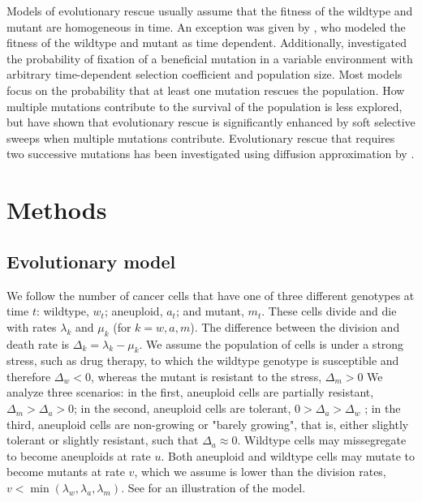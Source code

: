\documentclass[12pt]{extarticle}
\begin{document}
Models of evolutionary rescue usually assume that the fitness of the wildtype and mutant are homogeneous in time. An exception was given by \citet{marrec2020adapt}, who modeled the fitness of the wildtype and mutant as time dependent. Additionally, \citet{uecker2011fixation} investigated the probability of fixation of a beneficial mutation in a variable environment with arbitrary time-dependent selection coefficient and population size.
Most models focus on the probability that at least one mutation rescues the population. How multiple mutations contribute to the survival of the population is less explored, but \citet{wilson2017soft} have shown that evolutionary rescue is significantly enhanced by soft selective sweeps when multiple mutations contribute. 
Evolutionary rescue that requires two successive mutations has been investigated using diffusion approximation by \citet{martin2013probability}.

\section*{Methods}
\subsection*{Evolutionary model}

We follow the number of cancer cells that have one of three different genotypes at time $t$: wildtype, $w_t$; aneuploid, $a_t$; and mutant, $m_t$. 
These cells divide and die with rates $\lambda_k$ and $\mu_k$ (for $k=w, a, m$).
The difference between the division and death rate is $\Delta_k = \lambda_k-\mu_k$.
We assume the population of cells is under a strong stress, such as drug therapy, to which the wildtype genotype is susceptible and therefore $\Delta_w<0$, whereas the mutant is resistant to the stress, $\Delta_m>0$
We analyze three scenarios: in the first, aneuploid cells are partially resistant, $\Delta_m>\Delta_a>0$; in the second, aneuploid cells are tolerant, $0>\Delta_a>\Delta_w$ \citep[see][for the distinction between susceptible, resistant, and tolerant]{brauner2016distinguishing}; in the third, aneuploid cells are non-growing or "barely growing", that is, either slightly tolerant or slightly resistant, such that $\Delta_a \approx 0$.
Wildtype cells may missegregate to become aneuploids at rate $u$. Both aneuploid and wildtype cells may mutate to become mutants at rate $v$, which we assume is lower than the division rates, $v<\min{(\lambda_w, \lambda_a, \lambda_m)}$.
See  for an illustration of the model.
\end{document}
